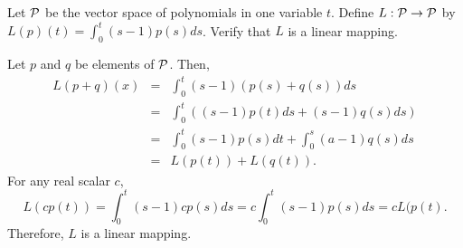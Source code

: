 \documentclass{ximera}
\begin{document}
\begin{exercise} \label{c7.2.6}
Let ${\cal P}$ be the vector space of polynomials in one variable
$t$.  Define $L:{\cal P}\to {\cal P}$ by $L(p)(t)=\int_0^t(s-1)p(s)ds$.
Verify that $L$ is a linear mapping.

\begin{solution}

\soln
Let $p$ and $q$ be elements of ${\cal P}$.  Then,
\[ 
\begin{array}{rcl}
L(p + q)(x) & = & \int_0^t(s - 1)(p(s) + q(s))ds \\
& = & \int_0^t ((s - 1)p(t)ds + (s - 1)q(s)ds) \\
& = & \int_0^t (s - 1)p(s)dt + \int_0^s (a - 1)q(s)ds \\
& = & L(p(t)) + L(q(t)). 
\end{array} 
\]
For any real scalar $c$,
\[ 
L(cp(t)) = \int_0^t (s - 1)cp(s)ds = c\int_0^t (s - 1)p(s)ds = cL(p(t). 
\]
Therefore, $L$ is a linear mapping.


\end{solution}
\end{exercise}
\end{document}
